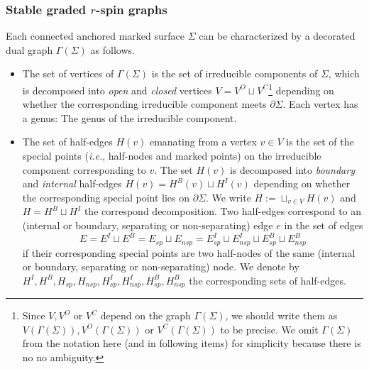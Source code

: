\documentclass[11pt]{amsart}
\theoremstyle{definition}
\theoremstyle{remark}
\newcommand{\<}{\left<}
\renewcommand{\>}{\right>}
\numberwithin{equation}{section}
\begin{document}
\subsubsection{Stable graded $r$-spin graphs}
Each connected anchored marked surface $\Sigma$ can be characterized by a decorated dual graph $\Gamma(\Sigma)$ %
as follows.
\begin{itemize}
\item The %
set of vertices of $\Gamma(\Sigma)$ is the set of irreducible components of $\Sigma$, which is decomposed into \textit{open} and \textit{closed} vertices  $V = V^O \sqcup V^C$\footnote{Since $V,V^O$ or $V^C$ depend on the graph $\Gamma(\Sigma)$, we should write them as $V(\Gamma(\Sigma)),V^O(\Gamma(\Sigma))$ or $V^C(\Gamma(\Sigma))$ to be precise. We omit $\Gamma(\Sigma)$ from the notation here (and in following items) for simplicity because there is no no ambiguity.} depending on whether the corresponding irreducible component meets $\partial \Sigma$. 
Each vertex has a %
genus: The genus %
of the irreducible component.

\item The set of half-edges $H(v)$ emanating from a vertex $v\in V$ is %
the set of the special points (\textit{i.e.}, half-nodes and marked points) on the irreducible %
component corresponding to $v$. The set $H(v)$ is decomposed into \textit{boundary} and \textit{internal} half-edges $H(v) = H^B(v) \sqcup H^I(v)$ depending on whether the corresponding special point lies on $\partial \Sigma$. We write $H:=\sqcup_{v\in V}H(v)$ and $H = H^B \sqcup H^I$ the correspond decomposition. Two half-edges correspond to an (internal or boundary, separating or non-separating) edge $e$ in the set of %
edges $$E=E^I\sqcup E^B=E_{sp}\sqcup E_{nsp}=E^I_{sp}\sqcup E^I_{nsp}\sqcup E^B_{sp}\sqcup E^B_{nsp}$$ if %
their corresponding special points are two half-nodes of the same (internal or boundary, separating or non-separating) node.  We denote by $H^I,H^B,H_{sp},H_{nsp},H^I_{sp},H^I_{nsp},H^B_{sp},H^B_{nsp}$ the corresponding sets of half-edges.


\end{itemize}
\end{document}

